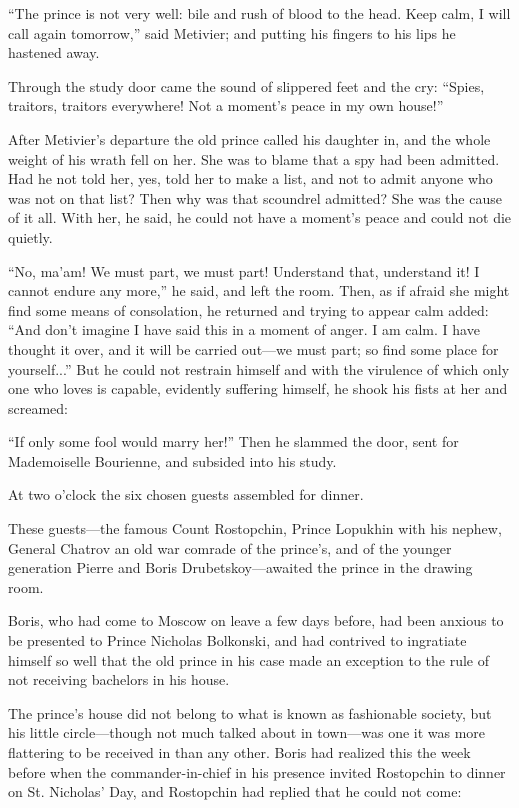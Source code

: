 ``The prince is not very well: bile and rush of blood to the
head. Keep calm, I will call again tomorrow,'' said Metivier; and
putting his fingers to his lips he hastened away.

Through the study door came the sound of slippered feet and the
cry: ``Spies, traitors, traitors everywhere! Not a moment's peace
in my own house!''

After Metivier's departure the old prince called his daughter in,
and the whole weight of his wrath fell on her. She was to blame
that a spy had been admitted. Had he not told her, yes, told her
to make a list, and not to admit anyone who was not on that list?
Then why was that scoundrel admitted? She was the cause of it
all. With her, he said, he could not have a moment's peace and
could not die quietly.

``No, ma'am! We must part, we must part! Understand that,
understand it!  I cannot endure any more,'' he said, and left the
room. Then, as if afraid she might find some means of
consolation, he returned and trying to appear calm added: ``And
don't imagine I have said this in a moment of anger. I am calm. I
have thought it over, and it will be carried out---we must part;
so find some place for yourself...'' But he could not restrain
himself and with the virulence of which only one who loves is
capable, evidently suffering himself, he shook his fists at her
and screamed:

``If only some fool would marry her!'' Then he slammed the door,
sent for Mademoiselle Bourienne, and subsided into his study.

At two o'clock the six chosen guests assembled for dinner.

These guests---the famous Count Rostopchin, Prince Lopukhin with
his nephew, General Chatrov an old war comrade of the prince's,
and of the younger generation Pierre and Boris
Drubetskoy---awaited the prince in the drawing room.

Boris, who had come to Moscow on leave a few days before, had
been anxious to be presented to Prince Nicholas Bolkonski, and
had contrived to ingratiate himself so well that the old prince
in his case made an exception to the rule of not receiving
bachelors in his house.

The prince's house did not belong to what is known as fashionable
society, but his little circle---though not much talked about in
town---was one it was more flattering to be received in than any
other. Boris had realized this the week before when the
commander-in-chief in his presence invited Rostopchin to dinner
on St. Nicholas' Day, and Rostopchin had replied that he could
not come:

